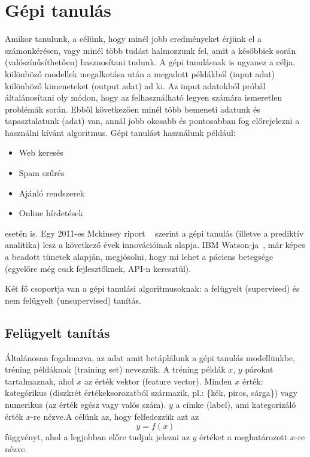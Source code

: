 \documentclass[a4paper,12pt]{article}
\begin{document}
\section{Gépi tanulás}

Amikor tanulunk, a célünk, hogy minél jobb eredményeket érjünk el a számonkérésen, vagy minél több tudást halmozzunk fel, amit a későbbiek során (valószínűsíthetően) hasznosítani tudunk. A gépi tanulásnak is ugyanez a célja, különböző modellek megalkotása után a megadott példákból (input adat) különböző kimeneteket (output adat) ad ki. Az input adatokból próbál általánosítani oly módon, hogy az felhasználható legyen számára ismeretlen problémák során. Ebből következően minél több bemeneti adatunk és tapasztalatunk (adat) van, annál jobb okosabb és pontosabban fog előrejelezni a használni kívánt algoritmus. Gépi tanulást használunk például: 
\begin{itemize}
\item Web keresés
\item Spam szűrés
\item Ajánló rendszerek
\item Online hírdetések
\end{itemize}
esetén is. 
Egy 2011-es Mckinsey riport ~\cite{mckinsey} szerint a gépi tanulás (illetve a prediktív analitika) lesz a következő évek innovációinak alapja. IBM Watson-ja~\cite{watson}, már képes a beadott tünetek alapján, megjósolni, hogy mi lehet a páciens betegsége (egyelőre még csak fejlesztőknek, API-n keresztül). \linebreak

Két fő csoportja van a gépi tanulási algoritmusoknak: a felügyelt (supervised) és nem felügyelt (unsupervised) tanítás.

\subsection{Felügyelt tanítás}

Általánosan fogalmazva, az adat amit betáplálunk a gépi tanulás modellünkbe, tréning példáknak (training set) nevezzük. A tréning példák $x$, $y$ párokat tartalmaznak, ahol $x$ az érték vektor (feature vector). Minden $x$ érték: kategórikus (diszkrét értékeksorozatból származik, pl.: \{kék, piros, sárga\}) vagy numerikus (az érték egész vagy valós szám). $y$ a címke (label), ami kategorizáló érték $x$-re nézve.A célünk az, hogy felfedezzük azt az 
\begin{equation*} y=f(x)
\end{equation*}
függvényt, ahol a legjobban előre tudjuk jelezni az $y$ értéket a meghatározott $x$-re nézve.
\end{document}
